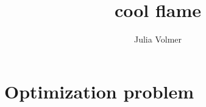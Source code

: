 \documentclass[a4paper,11pt,bibtotoc]{scrartcl}
\begin{document}
\title{cool flame}
\author{Julia Volmer}
\date{\empty}
\maketitle

\tableofcontents

\section{Optimization problem}
\end{document}
